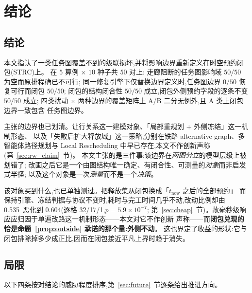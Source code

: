 \documentclass[manuscript,screen,review]{acmart}
\providecommand{\STRC}{\textsc{STRC}}
\newcommand{\NInst}{5}
\newcommand{\NSeeds}{10}
\newcommand{\NPairs}{50}
\newcommand{\PassMiss}{\NPairs/\NPairs}      %
\newcommand{\FeasRone}{0/\NPairs}            %
\newcommand{\FeasRtwo}{\NPairs/\NPairs}      %
\newcommand{\PassClosed}{\NPairs/\NPairs}    %
\newcommand{\PassInvar}{\NPairs/\NPairs}     %
\newcommand{\ResFracCheapRtwo}{0.535}
\newcommand{\ResFracAllFuture}{0.604}
\newcommand{\RAStabWTL}{32/17/1}     %
\newcommand{\RAStabP}{5.9\times10^{-7}}  %
\begin{document}
\section{结论}
\label{sec:conclusion}

\subsection{结论}

本文指认了一类任务图覆盖不到的级联损坏,并将影响边界重新定义在时空预约闭包(\STRC)上。
在 \(\NInst\) 算例 \(\times\) \(\NSeeds\) 种子共 \(\NPairs\) 对上:
走廊阻断的任务图影响域 \(\PassMiss\) 为空而原排程确已不可行;
同一修复引擎下仅替换边界定义时,任务图边界 \(\FeasRone\) 恢复可行而闭包 \(\FeasRtwo\);
闭包的结构闭合性 \(\PassClosed\) 成立,闭包外侧预约字段的逐条不变 \(\PassInvar\) 成立;
四类扰动 \(\times\) 两种边界的覆盖矩阵上 A/B 二分无例外,且 A 类上闭包边界一致包含
任务图边界。

主张的边界也已划清。让行关系这一建模对象、「局部重规划 + 外侧冻结」这一机制形态、
以及「失败后扩大释放域」这一策略,分别在铁路 alternative graph、多智能体路径规划与
Local Rescheduling 中早已存在,本文不作创新声称(第~\ref{sec:rw_claim}~节)。
本文主张的是三件事:该边界在\emph{两图分立}的模型层级上被划错了;
改画之后它是一个由图结构唯一确定、有闭合性、可测量的\emph{对象}而非启发式半径;
以及这个对象是一次\emph{测量}而不是一个\emph{决策}。

该对象买到什么,也已单独测过。把释放集从闭包换成「\(t_{\mathrm{now}}\) 之后的全部预约」
而保持引擎、冻结判据与协议不变时,耗时与完工时间几乎不动,改动比例却由
\ResFracCheapRtwo\ 恶化到 \ResFracAllFuture(逐格 \RAStabWTL,\(p=\RAStabP\);
第~\ref{sec:cheap}~节)。故毫秒级响应应归因于单遍改路这一机制形态——本文对它不作创新
声称——而\textbf{闭包兑现的恰是命题~\ref{prop:outside} 承诺的那个量:外侧不动}。
这也界定了收益的形状:它与闭包排除掉多少成正比,因而在闭包接近平凡上界时趋于消失。

\subsection{局限}
\label{sec:limitations}

以下四条按对结论的威胁程度排序,第~\ref{sec:future}~节逐条给出推进方向。
\end{document}
